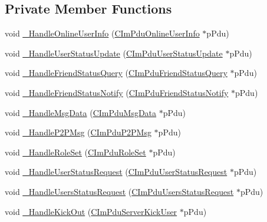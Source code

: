 \subsection*{Private Member Functions}
\begin{DoxyCompactItemize}
\item 
void \hyperlink{class_c_route_conn_ac1a603a6277a9814331b6e44afb05e24}{\+\_\+\+Handle\+Online\+User\+Info} (\hyperlink{class_c_im_pdu_online_user_info}{C\+Im\+Pdu\+Online\+User\+Info} $\ast$p\+Pdu)
\item 
void \hyperlink{class_c_route_conn_a500836991bdb5459b3a46139d9156f10}{\+\_\+\+Handle\+User\+Status\+Update} (\hyperlink{class_c_im_pdu_user_status_update}{C\+Im\+Pdu\+User\+Status\+Update} $\ast$p\+Pdu)
\item 
void \hyperlink{class_c_route_conn_a4c969e398e4dfc09b69c5b6bba47a275}{\+\_\+\+Handle\+Friend\+Status\+Query} (\hyperlink{class_c_im_pdu_friend_status_query}{C\+Im\+Pdu\+Friend\+Status\+Query} $\ast$p\+Pdu)
\item 
void \hyperlink{class_c_route_conn_a06588de04024feac97de4dc43a1231a7}{\+\_\+\+Handle\+Friend\+Status\+Notify} (\hyperlink{class_c_im_pdu_friend_status_notify}{C\+Im\+Pdu\+Friend\+Status\+Notify} $\ast$p\+Pdu)
\item 
void \hyperlink{class_c_route_conn_a9e9d118d458d35529112e2643b535d47}{\+\_\+\+Handle\+Msg\+Data} (\hyperlink{class_c_im_pdu_msg_data}{C\+Im\+Pdu\+Msg\+Data} $\ast$p\+Pdu)
\item 
void \hyperlink{class_c_route_conn_ab6b641312832ea723512f5e596af3c96}{\+\_\+\+Handle\+P2\+P\+Msg} (\hyperlink{class_c_im_pdu_p2_p_msg}{C\+Im\+Pdu\+P2\+P\+Msg} $\ast$p\+Pdu)
\item 
void \hyperlink{class_c_route_conn_a0b362cd8ff0bfadf77a804da3ce55490}{\+\_\+\+Handle\+Role\+Set} (\hyperlink{class_c_im_pdu_role_set}{C\+Im\+Pdu\+Role\+Set} $\ast$p\+Pdu)
\item 
void \hyperlink{class_c_route_conn_addd317ca4d7849ad5fd46f8af6e8d2fc}{\+\_\+\+Handle\+User\+Status\+Request} (\hyperlink{class_c_im_pdu_user_status_request}{C\+Im\+Pdu\+User\+Status\+Request} $\ast$p\+Pdu)
\item 
void \hyperlink{class_c_route_conn_abe1f1a0349df566a93c651da9094faea}{\+\_\+\+Handle\+Users\+Status\+Request} (\hyperlink{class_c_im_pdu_users_status_request}{C\+Im\+Pdu\+Users\+Status\+Request} $\ast$p\+Pdu)
\item 
void \hyperlink{class_c_route_conn_af62f990b71022127819d5f58411b1a96}{\+\_\+\+Handle\+Kick\+Out} (\hyperlink{class_c_im_pdu_server_kick_user}{C\+Im\+Pdu\+Server\+Kick\+User} $\ast$p\+Pdu)

\end{DoxyCompactItemize}
